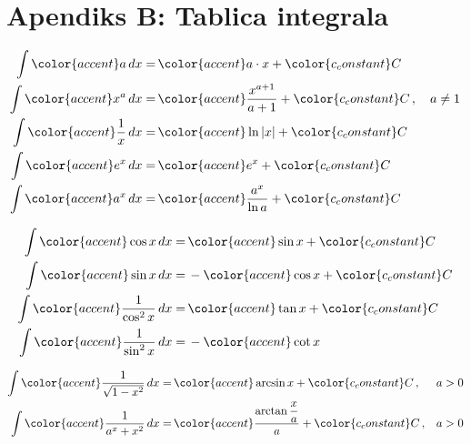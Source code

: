 \section{Apendiks B: Tablica integrala}


\begin{center}
    

\begin{align*}
    \int {\color{accent}a}\,dx =&\, {\color{accent}a\cdot x} + {\color{c_constant}C}\\
    \int {\color{accent}x^a} \,dx =&\, {\color{accent}\frac{x^{a+1}}{a+1}} + {\color{c_constant}C}\,,\quad a \neq 1\\
    \int {\color{accent}\frac{1}{x}}\,dx =&\, {\color{accent}\ln |x|} + {\color{c_constant}C}\\
    \int {\color{accent} e^x} \,dx =&\, {\color{accent} e^x} + {\color{c_constant}C}\\
    \int {\color{accent} a^x} \,dx =&\, {\color{accent} \frac{a^x}{\ln a}} + {\color{c_constant}C}
\end{align*}


\begin{multicols}{2}
    \begin{align*}
        \int {\color{accent} \cos x}\,dx =&\,{\color{accent} \sin x} + {\color{c_constant}C}\\
        \int {\color{accent} \sin x}\,dx =&\,-{\color{accent} \cos x} + {\color{c_constant}C}\\
        \int {\color{accent} \frac{1}{\cos^2x}}\,dx =&\,{\color{accent} \tan x} + {\color{c_constant}C}\\
        \int {\color{accent} \frac{1}{\sin^2x}}\,dx =&\,-{\color{accent} \cot x}
    \end{align*}

    \columnbreak

    \begin{align*}
        \int {\color{accent} \frac{1}{\sqrt{1 - x^2}}}\,dx = &\,{\color{accent} \arcsin x} + {\color{c_constant}C} \,,&&a > 0\\
        \int {\color{accent} \frac{1}{a^x + x^2}}\,dx = &\,{\color{accent} \dfrac{\arctan \dfrac{x}{a}}{a}} + {\color{c_constant}C}\,,&&a > 0
    \end{align*}
\end{multicols}


\end{center}
